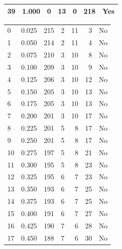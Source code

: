 \documentclass[a4paper,twoside,12pt]{book}
\begin{document}
\begin{appendices}
\begin{table}
\begin{tabular}{lrrrrrl}
		39 &  1.000 &         0 &        13 &               0 &             218 &    Yes \\
		\bottomrule
	\end{tabular}		
\end{table}
\begin{table}
	\centering
	\begin{tabular}{lrrrrrr}
		\toprule
		0  &  0.025 &       215 &         2 &              11 &               3 &     No \\
		1  &  0.050 &       214 &         2 &              11 &               4 &     No \\
		2  &  0.075 &       210 &         3 &              10 &               8 &     No \\
		3  &  0.100 &       209 &         3 &              10 &               9 &     No \\
		4  &  0.125 &       206 &         3 &              10 &              12 &     No \\
		5  &  0.150 &       205 &         3 &              10 &              13 &     No \\
		6  &  0.175 &       205 &         3 &              10 &              13 &     No \\
		7  &  0.200 &       201 &         3 &              10 &              17 &     No \\
		8  &  0.225 &       201 &         5 &               8 &              17 &     No \\
		9  &  0.250 &       201 &         5 &               8 &              17 &     No \\
		10 &  0.275 &       197 &         5 &               8 &              21 &     No \\
		11 &  0.300 &       195 &         5 &               8 &              23 &     No \\
		12 &  0.325 &       195 &         6 &               7 &              23 &     No \\
		13 &  0.350 &       193 &         6 &               7 &              25 &     No \\
		14 &  0.375 &       193 &         6 &               7 &              25 &     No \\
		15 &  0.400 &       191 &         6 &               7 &              27 &     No \\
		16 &  0.425 &       190 &         7 &               6 &              28 &     No \\
		17 &  0.450 &       188 &         7 &               6 &              30 &     No \\

\end{tabular}
\end{table}
\end{appendices}
\end{document}
